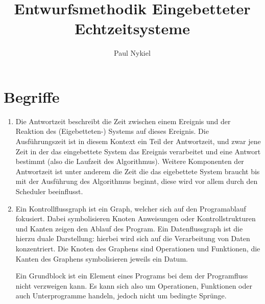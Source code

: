 \documentclass[DIN, pagenumber=false, fontsize=11pt, parskip=half]{scrartcl}
\title{Entwurfsmethodik Eingebetteter Echtzeitsysteme}
\author{Paul Nykiel}
\begin{document}
    \maketitle
    \section{Begriffe}
    \begin{enumerate}[label=\alph*)]
        \item Die Antwortzeit beschreibt die Zeit zwischen einem Ereignis und
            der Reaktion des (Eigebetteten-) Systems auf dieses Ereignis. Die
            Ausführungszeit ist in diesem Kontext ein Teil der Antwortzeit, und zwar
            jene Zeit in der das eingebettete System das Ereignis verarbeitet und eine
            Antwort bestimmt (also die Laufzeit des Algorithmus). Weitere Komponenten
            der Antwortzeit ist unter anderem die Zeit die das eigebettete System
            braucht bis mit der Ausführung des Algorithmus beginnt, diese wird
            vor allem durch den Scheduler beeinflusst. 
        \item Ein Kontrollflussgraph ist ein Graph, welcher sich auf den Programablauf
            fokusiert. Dabei symbolisieren Knoten Anweisungen oder Kontrollstrukturen
            und Kanten zeigen den Ablauf des Program. Ein Datenflussgraph ist die hierzu
            duale Darstellung: hierbei wird sich auf die Verarbeitung von Daten 
            konzentriert. Die Knoten des Graphens sind Operationen und Funktionen,
            die Kanten des Graphens symbolisieren jeweils ein Datum.

            Ein Grundblock ist ein Element eines Programs bei dem der Programfluss
            nicht verzweigen kann. Es kann sich also um Operationen, Funktionen
            oder auch Unterprogramme handeln, jedoch nicht um bedingte Sprünge.
    \end{enumerate}
\end{document}

